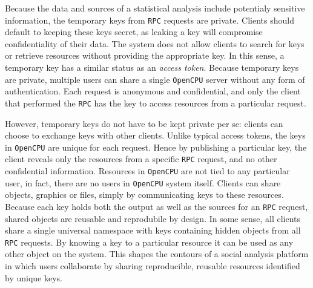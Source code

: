 \documentclass{article}
\newcommand{\RPC}{\texttt{RPC}\xspace}
\newcommand{\OpenCPU}{\texttt{OpenCPU}\xspace}
\begin{document}
Because the data and sources of a statistical analysis include potentialy sensitive information, the temporary keys from \RPC requests are private. Clients should default to keeping these keys secret, as leaking a key will compromise confidentiality of their data. The system does not allow clients to search for keys or retrieve resources without providing the appropriate key. In this sense, a temporary key has a similar status as an \emph{access token}. Because temporary keys are private, multiple users can share a single \OpenCPU server without any form of authentication. Each request is anonymous and confidential, and only the client that performed the \RPC has the key to access resources from a particular request.

However, temporary keys do not have to be kept private per se: clients can choose to exchange keys with other clients. Unlike typical access tokens, the keys in \OpenCPU are unique for each request. Hence by publishing a particular key, the client reveals only the resources from a specific \RPC request, and no other confidential information. Resources in \OpenCPU are not tied to any particular user, in fact, there are no users in \OpenCPU system itself. Clients can share objects, graphics or files, simply by communicating keys to these resources. Because each key holds both the output as well as the sources for an \RPC request, shared objects are reusable and reprodubile by design. In some sense, all clients share a single universal namespace with keys containing hidden objects from all \RPC requests. By knowing a key to a particular resource it can be used as any other object on the system. This shapes the contours of a social analysis platform in which users collaborate by sharing reproducible, reusable resources identified by unique keys.




\end{document}
